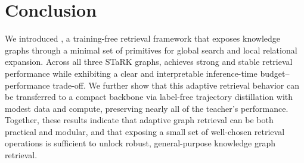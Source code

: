 
\section{Conclusion}
\label{conclusion}
We introduced \retriever, a training-free retrieval framework that exposes knowledge graphs through a minimal set of primitives for global search and local relational expansion. Across all three STaRK graphs, \retrieverShort achieves strong and stable retrieval performance while exhibiting a clear and interpretable inference-time budget–performance trade-off. We further show that this adaptive retrieval behavior can be transferred to a compact backbone via label-free trajectory distillation with modest data and compute, preserving nearly all of the teacher’s performance. Together, these results indicate that adaptive graph retrieval can be both practical and modular, and that exposing a small set of well-chosen retrieval operations is sufficient to unlock robust, general-purpose knowledge graph retrieval.